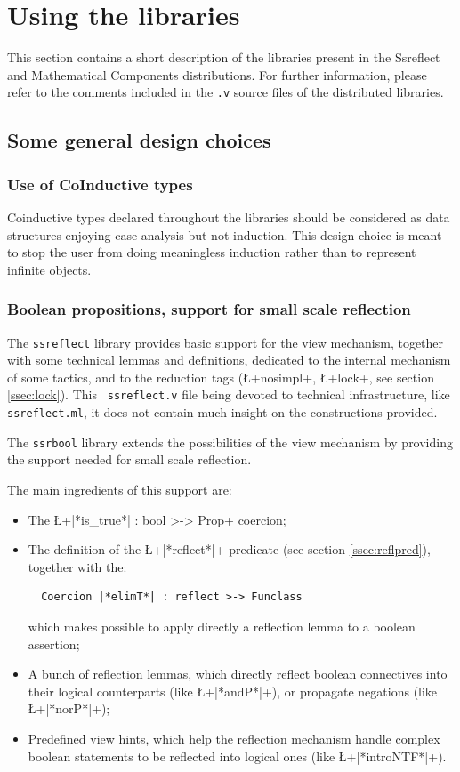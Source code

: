 \section{Using the libraries}

This section contains a short description of the libraries
present in the Ssreflect and Mathematical Components
distributions. For further information, please
refer to the comments included in the {\tt .v} source files of the
distributed libraries.


\subsection{Some general design choices}

\subsubsection*{Use of CoInductive types}

Coinductive types declared throughout the libraries should be
considered as data structures enjoying case analysis but not induction.
This design choice is meant
to stop the user from doing meaningless induction rather than
to represent infinite objects.

\subsubsection*{Boolean propositions, support for small scale reflection}

The {\tt ssreflect} library
provides basic support for the view mechanism, together with some
technical lemmas and definitions, dedicated to the
internal mechanism of some \ssr{} tactics, and to the reduction tags
(\L+nosimpl+, \L+lock+, see section \ref{ssec:lock}). This {\tt
  ssreflect.v} file being devoted to technical infrastructure, like
 {\tt ssreflect.ml}, it does not contain much insight on the
 constructions provided.



The {\tt ssrbool} library extends the possibilities of the view
mechanism by providing the support needed for small scale reflection.

The main ingredients of this support are:
\begin{itemize}
\item The \L+|*is_true*| : bool >-> Prop+ coercion;
\item The definition of the \L+|*reflect*|+ predicate (see
section \ref{ssec:reflpred}), together with the:
\begin{lstlisting}
  Coercion |*elimT*| : reflect >-> Funclass
\end{lstlisting}
which makes possible to apply directly a reflection lemma to a boolean
assertion;
\item A bunch of reflection lemmas, which directly reflect
  boolean connectives into their logical counterparts (like \L+|*andP*|+),
  or propagate negations (like \L+|*norP*|+);
\item Predefined view hints, which help the reflection mechanism
  handle complex boolean statements to be reflected into logical ones
  (like \L+|*introNTF*|+).
\end{itemize}

